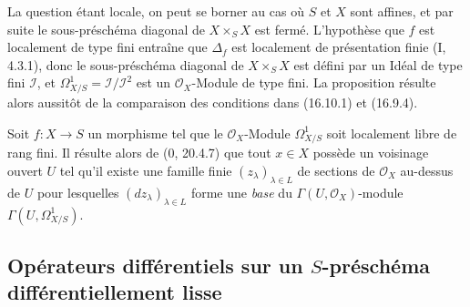 
La question étant locale, on peut se borner au cas où $S$ et $X$ sont
affines, et par suite le sous-préschéma diagonal de $X\times_S X$ est fermé.
L'hypothèse que $f$ est localement de type fini entraîne que $\Delta_f$ est
localement de présentation finie (I, 4.3.1), donc le sous-préschéma diagonal
de $X\times_S X$ est défini par un Idéal de type fini $\mathscr{I}$, et
$\Omega_{X/S}^1=\mathscr{I}/\mathscr{I}^2$ est un $\mathcal{O}_X$-Module de
type fini. La proposition résulte alors aussitôt de la comparaison des
conditions dans (16.10.1) et (16.9.4).

\begin{remark}[16.10.6]
\label{IV.16.10.6}
Soit $f:X\to S$ un morphisme tel que le $\mathcal{O}_X$-Module
$\Omega_{X/S}^1$ soit localement libre de rang fini. Il résulte alors de
(0, 20.4.7) que tout $x\in X$ possède un voisinage ouvert $U$ tel qu'il existe
une famille finie $(z_\lambda)_{\lambda\in L}$ de sections de
$\mathcal{O}_X$ au-dessus de $U$ pour lesquelles $(dz_\lambda)_{\lambda\in L}$
forme une \emph{base} du $\Gamma(U,\mathcal{O}_X)$-module
$\Gamma(U,\Omega_{X/S}^1)$.
\end{remark}

\subsection{\texorpdfstring{Opérateurs différentiels sur un $S$-préschéma différentiellement
lisse}{Opérateurs différentiels sur un S-préschéma différentiellement lisse}}

